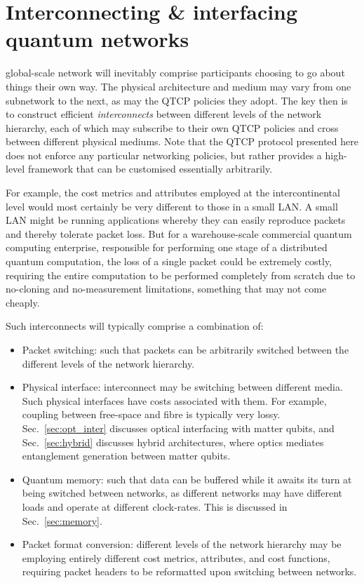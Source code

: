 %
%

\section{Interconnecting \& interfacing quantum networks} \label{sec:inter} 

 global-scale network will inevitably comprise participants choosing to go about things their own way. The physical architecture and medium may vary from one subnetwork to the next, as may the QTCP policies they adopt. The key then is to construct efficient \textit{interconnects} between different levels of the network hierarchy, each of which may subscribe to their own QTCP policies and cross between different physical mediums. Note that the QTCP protocol presented here does not enforce any particular networking policies, but rather provides a high-level framework that can be customised essentially arbitrarily.

For example, the cost metrics and attributes employed at the intercontinental level would most certainly be very different to those in a small LAN. A small LAN might be running applications whereby they can easily reproduce packets and thereby tolerate packet loss. But for a warehouse-scale commercial quantum computing enterprise, responsible for performing one stage of a distributed quantum computation, the loss of a single packet could be extremely costly, requiring the entire computation to be performed completely from scratch due to no-cloning and no-measurement limitations, something that may not come cheaply.

Such interconnects will typically comprise a combination of:
\begin{itemize}
\item Packet switching: such that packets can be arbitrarily switched between the different levels of the network hierarchy.
\item Physical interface: interconnect may be switching between different media. Such physical interfaces have costs associated with them. For example, coupling between free-space and fibre is typically very lossy. Sec.~\ref{sec:opt_inter} discusses optical interfacing with matter qubits, and Sec.~\ref{sec:hybrid} discusses hybrid architectures, where optics mediates entanglement generation between matter qubits.
\item Quantum memory: such that data can be buffered while it awaits its turn at being switched between networks, as different networks may have different loads and operate at different clock-rates. This is discussed in Sec.~\ref{sec:memory}.
\item Packet format conversion: different levels of the network hierarchy may be employing entirely different cost metrics, attributes, and cost functions, requiring packet headers to be reformatted upon switching between networks.
\end{itemize}

